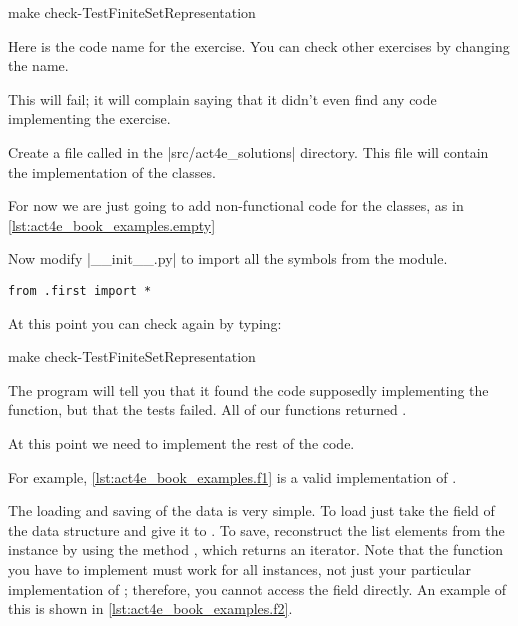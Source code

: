 \begin{console}
  make check-TestFiniteSetRepresentation
\end{console}

Here  is the code name for the exercise. You can check other exercises by changing the name.

This will fail; it will complain saying that it didn't even find any code implementing the exercise.


Create a file called  in the \files|src/act4e_solutions| directory.
This file will contain the implementation of the classes.

For now we are just going to add non-functional code for the classes,
as in \cref{lst:act4e_book_examples.empty}

\begin{longcode}
  \caption{}

  \label{lst:act4e_book_examples.empty}
\end{longcode}

Now modify \files|__init__.py| to import all the symbols from the  module.

\begin{verbatim}
from .first import *
\end{verbatim}

At this point you can check again by typing:

\begin{console}
  make check-TestFiniteSetRepresentation
\end{console}

The program will tell you that it found the code supposedly implementing the function,
but that the tests failed. All of our functions returned .

At this point we need to implement the rest of the code.

For example, \cref{lst:act4e_book_examples.f1} is a valid implementation of \FiniteSet.

\begin{longcode}
  \caption{}
  \label{lst:act4e_book_examples.f1}
\end{longcode}

The loading and saving of the data is very simple.
To load just take the  field of the data structure and give it to .
To save, reconstruct the list elements from the  instance by using the method , which returns an iterator.
Note that the  function you have to implement must work for all \FiniteSet instances, not just your particular implementation of \FiniteSet; therefore, you cannot access the  field directly.
An example of this is shown in \cref{lst:act4e_book_examples.f2}.

